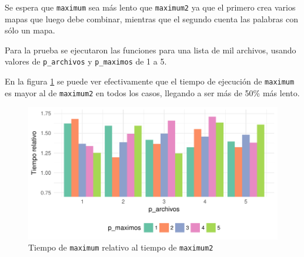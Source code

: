 Se espera que \texttt{maximum} sea más lento que \texttt{maximum2} ya que el primero crea varios mapas que luego debe combinar, mientras que el segundo cuenta las palabras con sólo un mapa.

Para la prueba se ejecutaron las funciones para una lista de mil archivos, usando valores de \texttt{p\_archivos} y \texttt{p\_maximos} de 1 a 5.

En la figura \ref{fig:test_tiempos} se puede ver efectivamente que el tiempo de ejecución de \texttt{maximum} es mayor al de \texttt{maximum2} en todos los casos, llegando a ser más de 50\% más lento.

\begin{figure}[!h]
\includegraphics{figuras/tiempos.pdf}
\caption{Tiempo de \texttt{maximum} relativo al tiempo de \texttt{maximum2}}
\label{fig:test_tiempos}
\end{figure}